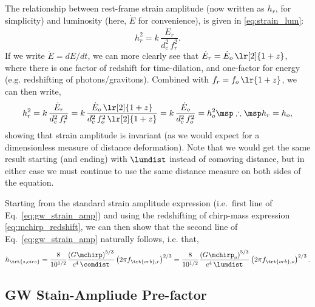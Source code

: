 \documentclass[10pt, oneside, onecolumn]{article}   	%
\newcommand{\hscirc}{h_\trt{s,circ}}
\newcommand{\frstorb}{f_{\trt{orb},r}}
\newcommand{\fobsorb}{f_{\trt{orb},o}}
\begin{document}
            The relationship between rest-frame strain amplitude (now written as $h_r$, for simplicity) and luminosity (here, $\dot{E}$ for convenience), is given in \eqref{eq:strain_lum}:
            \begin{equation}
                h_r^2 = k \, \frac{\dot{E}_r}{d_c^2 \, f_r^2}.
            \end{equation}
            If we write $\dot{E} = dE/dt$, we can more clearly see that $\dot{E}_r = \dot{E}_o \, \lr[2]{1+z}$, where there is one factor of redshift for time-dilation, and one-factor for energy (e.g. redshifting of photons/gravitons).  Combined with $f_r = f_o \, \lr{1+z}$, we can then write,
            \begin{equation}
                h_r^2 = k \, \frac{\dot{E}_r}{d_c^2 \, f_r^2} = k \, \frac{\dot{E}_o \, \lr[2]{1+z}}{d_c^2 \, f_o^2 \, \lr[2]{1+z}} = k \, \frac{\dot{E}_o}{d_c^2 \, f_o^2} = h_o^2 \msp \therefore \msp h_r = h_o,
            \end{equation}
            showing that strain amplitude is invariant (as we would expect for a dimensionless measure of distance deformation).  Note that we would get the same result starting (and ending) with $\lumdist$ instead of comoving distance, but in either case we must continue to use the same distance measure on both sides of the equation.

            Starting from the standard strain amplitude expression (i.e.~first line of Eq.~\ref{eq:gw_strain_amp}) and using the redshifting of chirp-mass expression \eqref{eq:mchirp_redshift}, we can then show that the second line of Eq.~\ref{eq:gw_strain_amp} naturally follows, i.e. that,
            \begin{equation}
                \hscirc
                = \frac{8}{10^{1/2}} \frac{\left(G\mchirp\right)^{5/3}}{c^4 \, \comdist} \left(2 \pi \frstorb \right)^{2/3}
                = \frac{8}{10^{1/2}} \frac{\left(G\mchirp_o\right)^{5/3}}{c^4 \, \lumdist} \left(2 \pi \fobsorb \right)^{2/3}.
            \end{equation}


        \subsection{GW Stain-Ampliude Pre-factor}


    
    
\end{document}
